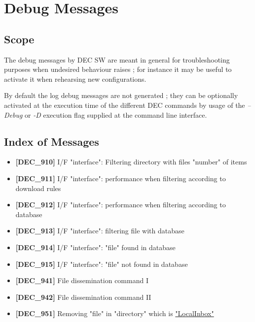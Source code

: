 \documentclass[dec_sum_main.tex]{subfiles}
\begin{document}

\newpage
\section{Debug Messages}

\subsection{Scope}
The debug messages by DEC SW are meant in general for troubleshooting purposes when undesired behaviour raises ; for instance it may be useful to activate it when rehearsing new configurations. \newline

\par
\noindent
By default the log debug messages are not generated ; they can be optionally activated at the execution time of the different DEC commands by usage of the \textit{--Debug} or \textit{-D} execution flag supplied at the command line interface.


\subsection{Index of Messages}

\begin{itemize}
	\item \textbf{[DEC\_910]} I/F "interface": Filtering directory with files "number" of items
	\item \textbf{[DEC\_911]} I/F "interface": performance when filtering according to download rules 
	\item \textbf{[DEC\_912]} I/F "interface": performance when filtering according to database
	\item \textbf{[DEC\_913]} I/F "interface": filtering file with database
	\item \textbf{[DEC\_914]} I/F "interface": "file" found in database
	\item \textbf{[DEC\_915]} I/F "interface": "file" not found in database	
	\item \textbf{[DEC\_941]} File dissemination command I
	\item \textbf{[DEC\_942]} File dissemination command II	
	\item \textbf{[DEC\_951]} Removing "file" in "directory" which is \hyperref[LocalInbox]{"LocalInbox"}
\end{itemize}
\end{document}
